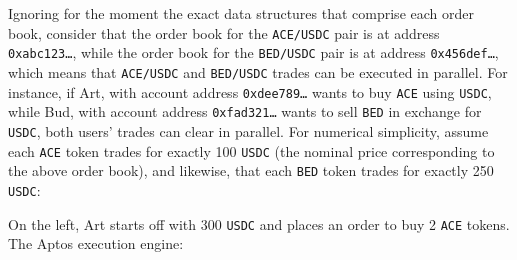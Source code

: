 \documentclass{scrartcl}
\begin{document}
Ignoring for the moment the exact data structures that comprise each order book, consider that the order book for the \texttt{ACE/USDC} pair is at address \texttt{0xabc123\ldots}, while the order book for the \texttt{BED/USDC} pair is at address \texttt{0x456def\ldots}, which means that \texttt{ACE/USDC} and \texttt{BED/USDC} trades can be executed in parallel.
For instance, if Art, with account address \texttt{0xdee789\ldots} wants to buy \texttt{ACE} using \texttt{USDC}, while Bud, with account address \texttt{0xfad321\ldots} wants to sell \texttt{BED} in exchange for \texttt{USDC}, both users' trades can clear in parallel.
For numerical simplicity, assume each \texttt{ACE} token trades for exactly 100 \texttt{USDC} (the nominal price corresponding to the above order book), and likewise, that each \texttt{BED} token trades for exactly 250 \texttt{USDC}:

\begin{center}
\end{center}

On the left, Art starts off with 300 \texttt{USDC} and places an order to buy 2 \texttt{ACE} tokens.
The Aptos execution engine:
\end{document}
